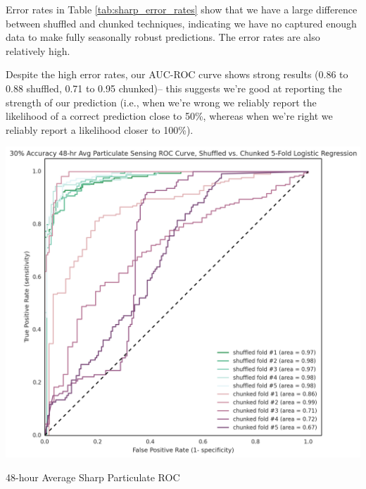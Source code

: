 Error rates in Table \ref{tab:sharp_error_rates} show that we have a large difference between shuffled and chunked techniques, indicating we have no captured enough data to make fully seasonally robust predictions.  The error rates are also relatively high.

\begin{margintable}
\centering
\offinterlineskip
\hspace*{-5cm}\raisebox{-4cm}[0pt][0pt]{}\par
\hspace{.3cm}\par
\vspace{-.5cm}
\hspace*{1cm}\par
{}
\vspace{-.35cm}\raisebox{-1cm}
}
\label{tab:sharp_confusion}
\caption{Average Sharp Particulate Confusion Matrix w/Shuffled K-Fold}
\end{margintable}

Despite the high error rates, our AUC-ROC curve shows strong results (0.86 to 0.88 shuffled, 0.71 to 0.95 chunked)-- this suggests we're good at reporting the strength of our prediction (i.e., when we're wrong we reliably report the likelihood of a correct prediction close to 50\%, whereas when we're right we reliably report a likelihood closer to 100\%).  

\begin{marginfigure}
 	\includegraphics[width=\textwidth]{figs/sharp_48_avg_goals_30_roc}               
 	 \caption{48-hour Average Sharp Particulate ROC}
  	\label{fig:sharp_48_avg_goals_30_roc}
\end{marginfigure}


